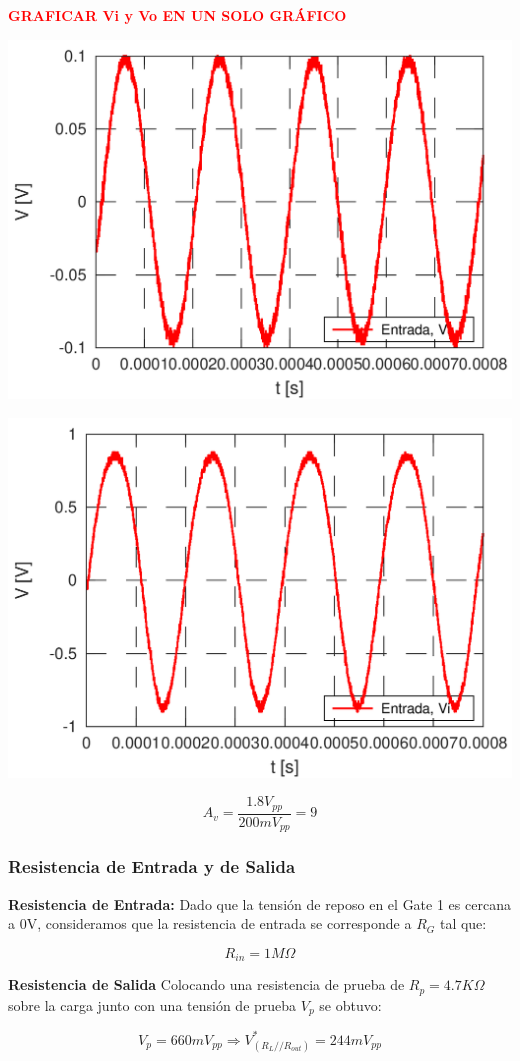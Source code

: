 \documentclass[a4paper, 10pt, spanish]{article}
\begin{document}
\textbf{\textcolor{red}{GRAFICAR Vi y Vo EN UN SOLO GRÁFICO}}
\begin{center}
  \includegraphics[width=.5\textwidth]{vi.png}
  \label{fig:vi_med}
\end{center}

\begin{center}
  \includegraphics[width=.5\textwidth]{vo.png}
  \label{fig:vo_med}
\end{center}


\begin{equation}
  A_v=\frac{1.8V_{pp}}{200mV_{pp}}=9
\end{equation}

\subsubsection{Resistencia de Entrada y de Salida}
\textbf{Resistencia de Entrada:}
Dado que la tensión de reposo en el Gate 1 es cercana a 0V, consideramos que la resistencia de entrada se corresponde a $R_G$ tal que:

\begin{equation}
  R_{in}=1M\Omega
\end{equation}

\textbf{Resistencia de Salida}
Colocando una resistencia de prueba de $R_p = 4.7K\Omega$ sobre la carga junto con una tensión de prueba $V_p$ se obtuvo:

\begin{equation}
  V_p= 660mV_{pp} \Rightarrow V^*_{(R_L//R_{out})} = 244 mV_{pp}
\end{equation}
\end{document}
